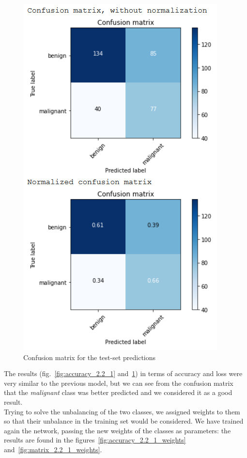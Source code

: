 \documentclass[11pt,a4paper,oneside]{article}
\begin{document}
\begin{figure}[h]
\begin{minipage}[c]{.4\textwidth}
		\includegraphics[width=.9\textwidth]{images/2.2/5_matrix}
		\caption{Confusion matrix for the test-set predictions}
		\label{fig:matrix_2.2_1}
	\end{minipage}%
\end{figure}

The results (fig.~\ref{fig:accuracy_2.2_1} and~\ref{fig:matrix_2.2_1}) in terms of accuracy and loss were very similar to the previous model, but we can see from the confusion matrix that the \textit{malignant} class was better predicted and we considered it as a good result.\\

Trying to solve the unbalancing of the two classes, we assigned weights to them so that their unbalance in the training set would be considered. We have trained again the network, passing the new weights of the classes as parameters: the results are found in the figures~\ref{fig:accuracy_2.2_1_weights} and~\ref{fig:matrix_2.2_1_weights}. 
\end{document}
